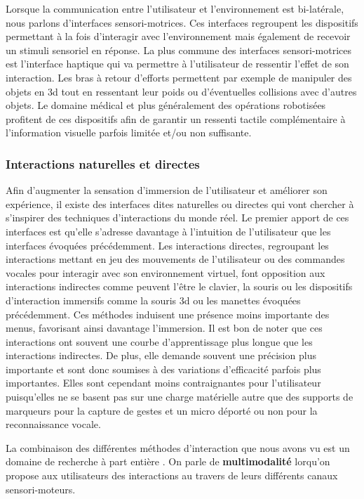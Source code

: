 Lorsque la communication entre l'utilisateur et l'environnement est bi-latérale, nous parlons d'interfaces sensori-motrices. Ces interfaces regroupent les dispositifs permettant à la fois d'interagir avec l'environnement mais également de recevoir un stimuli sensoriel en réponse. La plus commune des interfaces sensori-motrices est l'interface haptique qui va permettre à l'utilisateur de ressentir l'effet de son interaction. Les bras à retour d'efforts permettent par exemple de manipuler des objets en 3d tout en ressentant leur poids ou d'éventuelles collisions avec d'autres objets. Le domaine médical et plus généralement des opérations robotisées profitent de ces dispositifs afin de garantir un ressenti tactile complémentaire à l'information visuelle parfois limitée et/ou non suffisante.

\subsubsection{Interactions naturelles et directes} \label{interface_nature}

Afin d'augmenter la sensation d'immersion de l'utilisateur et améliorer son expérience, il existe des interfaces dites naturelles ou directes qui vont chercher à s'inspirer des techniques d'interactions du monde réel. Le premier apport de ces interfaces est qu'elle s'adresse davantage à l'intuition de l'utilisateur que les interfaces évoquées précédemment.
Les interactions directes, regroupant les interactions mettant en jeu des mouvements de l'utilisateur ou des commandes vocales pour interagir avec son environnement virtuel, font opposition aux interactions indirectes comme peuvent l'être le clavier, la souris ou les dispositifs d'interaction immersifs comme la souris 3d ou les manettes évoquées précédemment. Ces méthodes induisent une présence moins importante des menus, favorisant ainsi davantage l'immersion. Il est bon de noter que ces interactions ont souvent une courbe d'apprentissage plus longue que les interactions indirectes. De plus, elle demande souvent une précision plus importante et sont donc soumises à des variations d'efficacité parfois plus importantes. Elles sont cependant moins contraignantes pour l'utilisateur puisqu'elles ne se basent pas sur une charge matérielle autre que des supports de marqueurs pour la capture de gestes et un micro déporté ou non pour la reconnaissance vocale.

La combinaison des différentes méthodes d'interaction que nous avons vu est un domaine de recherche à part entière \cite{martin_hardware_2014,martin_reconfigurable_2011}. On parle de \textbf{multimodalité} lorqu'on propose aux utilisateurs des interactions au travers de leurs différents canaux sensori-moteurs.

